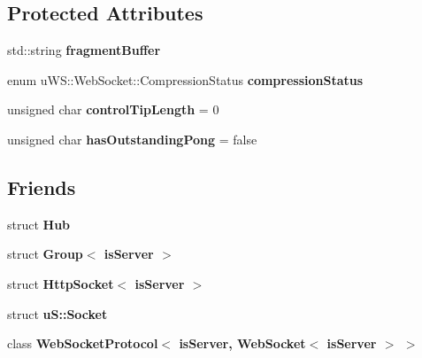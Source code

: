 \subsection*{Protected Attributes}
\begin{DoxyCompactItemize}
\item 
\mbox{\label{structu_w_s_1_1_web_socket_afff2c1e107c502cd56e4c6ebc91e6cd2}} 
std\+::string {\bfseries fragment\+Buffer}
\item 
\mbox{\label{structu_w_s_1_1_web_socket_a71d49fc7a0c7707f4575a7c30aaea290}} 
enum u\+W\+S\+::\+Web\+Socket\+::\+Compression\+Status {\bfseries compression\+Status}
\item 
\mbox{\label{structu_w_s_1_1_web_socket_a4bca0616dbb70137c6af4b624a1dd1b7}} 
unsigned char {\bfseries control\+Tip\+Length} = 0
\item 
\mbox{\label{structu_w_s_1_1_web_socket_aa5ef47d960be42371c55730c8e02c0bd}} 
unsigned char {\bfseries has\+Outstanding\+Pong} = false
\end{DoxyCompactItemize}
\subsection*{Friends}
\begin{DoxyCompactItemize}
\item 
\mbox{\label{structu_w_s_1_1_web_socket_af20bcb1dd4e741f2423d470bb4cd994d}} 
struct {\bfseries Hub}
\item 
\mbox{\label{structu_w_s_1_1_web_socket_affca6387c623de2a14b35a1906d4c67e}} 
struct {\bfseries Group$<$ is\+Server $>$}
\item 
\mbox{\label{structu_w_s_1_1_web_socket_adfdd169bc01521a773f206faec86954e}} 
struct {\bfseries Http\+Socket$<$ is\+Server $>$}
\item 
\mbox{\label{structu_w_s_1_1_web_socket_aa3516c90697652732deaa6ba9bfb375b}} 
struct {\bfseries u\+S\+::\+Socket}
\item 
\mbox{\label{structu_w_s_1_1_web_socket_a66b6fc0432352dbcdd08ff562d68b81b}} 
class {\bfseries Web\+Socket\+Protocol$<$ is\+Server, Web\+Socket$<$ is\+Server $>$ $>$}
\end{DoxyCompactItemize}
